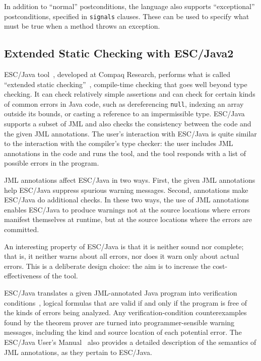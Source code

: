 In addition to ``normal'' postconditions, the language also supports
``exceptional'' postconditions, specified in {\tt signals} clauses.
These can be used to specify what must be true when a method throws an
exception. 



\subsection{Extended Static Checking with ESC/Java2}
\label{escjava}

ESC/Java tool~\cite{Flanagan-Et-Al02}, developed at Compaq Research,
performs what is called ``extended static
checking''~\cite{ESC:Overview,10yearsESC},
compile-time checking that goes well beyond type checking.  It can
check relatively simple assertions and can check for certain kinds of
common errors in Java code, such as dereferencing \texttt{null},
indexing an array outside its bounds, or casting a reference to an
impermissible type.  ESC/Java supports a subset of JML and also checks
the consistency between the code and the given JML annotations.  The
user's interaction with ESC/Java is quite similar to the interaction
with the compiler's type checker: the user includes JML annotations in
the code and runs the tool, and the tool responds with a list of
possible errors in the program.

JML annotations affect ESC/Java in two ways.  First, the given JML
annotations help ESC/Java suppress spurious warning messages.   Second,
annotations make ESC/\-Java do additional checks.  
In these two ways, the use of JML annotations enables ESC/Java to
produce warnings not at the source locations where errors manifest
themselves at runtime, but at the source locations where the errors
are committed.

An interesting property of ESC/Java is that it is neither sound nor
complete; that is, it neither warns about all errors, nor does it
warn only about actual errors.  This is a deliberate design choice:
the aim is to increase the cost-effectiveness of the tool.  

ESC/Java translates a
given JML-an\-no\-tat\-ed Java program into verification
conditions~\cite{LeinoSaxeStata:JavaViaGC,FlanaganSaxe:POPL01},
logical formulas that are valid if and only if the program is free of
the kinds of errors being analyzed.  Any verification-condition
counterexamples found by the theorem prover are turned into
programmer-sensible warning messages, including the kind and source
location of each potential error.  The ESC/Java User's
Manual~\cite{escjava:userman} also provides a detailed description of
the semantics of JML annotations, as they pertain to ESC/Java.

